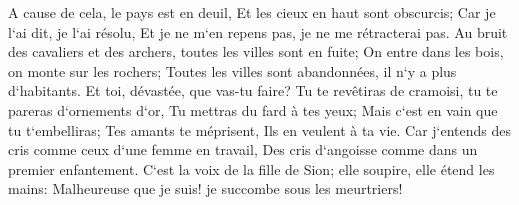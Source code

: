 \verse A cause de cela, le pays est en deuil, Et les cieux en haut sont obscurcis; Car je l`ai dit, je l`ai résolu, Et je ne m`en repens pas, je ne me rétracterai pas. 
\verse Au bruit des cavaliers et des archers, toutes les villes sont en fuite; On entre dans les bois, on monte sur les rochers; Toutes les villes sont abandonnées, il n`y a plus d`habitants. 
\verse Et toi, dévastée, que vas-tu faire? Tu te revêtiras de cramoisi, tu te pareras d`ornements d`or, Tu mettras du fard à tes yeux; Mais c`est en vain que tu t`embelliras; Tes amants te méprisent, Ils en veulent à ta vie. 
\verse Car j`entends des cris comme ceux d`une femme en travail, Des cris d`angoisse comme dans un premier enfantement. C`est la voix de la fille de Sion; elle soupire, elle étend les mains: Malheureuse que je suis! je succombe sous les meurtriers! 

